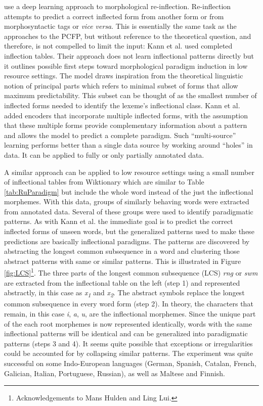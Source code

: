 \documentclass[12pt]{article}
\begin{document}
 use a deep learning approach to morphological re-inflection. Re-inflection attempts to predict a correct inflected form from another form or from morphosyntactic tags or \textit{vice versa}. This is essentially the same task as the approaches to the PCFP, but without reference to the theoretical question, and therefore, is not compelled to limit the input: Kann et al. used completed inflection tables. Their approach does not learn inflectional patterns directly but it outlines possible first steps toward morphological paradigm induction in low resource settings. The model draws inspiration from the theoretical linguistic notion of principal parts \cite{finkel_principal_2007} which refers to minimal subset of forms that allow maximum predictability. This subset can be thought of as the smallest number of inflected forms needed to identify the lexeme's inflectional class. Kann et al. added encoders that incorporate multiple inflected forms, with the assumption that these multiple forms provide complementary information about a pattern and allows the model to predict a complete paradigm. Such ``multi-source'' learning performs better than a single data source by working around ``holes” in data. It can be applied to fully or only partially annotated data.

A similar approach can be applied to low resource settings \cite{ahlberg_semi-supervised_2014,ahlberg_paradigm_2015} using a small number of inflectional tables from Wiktionary which are similar to Table \ref{tab:RuParadigm} but include the whole word instead of the just the inflectional morphemes. With this data, groups of similarly behaving words were extracted from annotated data. Several of these groups were used to identify paradigmatic patterns.  As with Kann et al. the immediate goal is to predict the correct inflected forms of unseen words, but the generalized patterns used to make these predictions are basically inflectional paradigms. The patterns are discovered by abstracting the longest common subsequence in a word and clustering those abstract patterns with same or similar patterns. This is illustrated in Figure \ref{fig:LCS}\footnote{Acknowledgements to Mans Hulden and Ling Lui.}. The three parts of the longest common subsequence (LCS) \textit{rng} or \textit{swm} are extracted from the inflectional table on the left (step 1) and represented abstractly, in this case as \textit{x\textsubscript{1}} and \textit{x\textsubscript{2}}. The abstract symbols replace the longest common subsequence in every word form (step 2). In theory, the characters that remain, in this case \textit{i}, \textit{a}, \textit{u}, are the inflectional morphemes. Since the unique part of the each root morphemes is now represented identically, words with the same inflectional patterns will be identical and can be generalized into paradigmatic patterns (steps 3 and 4). It seems quite possible that exceptions or irregularities could be accounted for by collapsing similar patterns. The experiment was quite successful on some Indo-European languages (German, Spanish, Catalan, French, Galician, Italian, Portuguese, Russian), as well as Maltese and Finnish.
\end{document}
